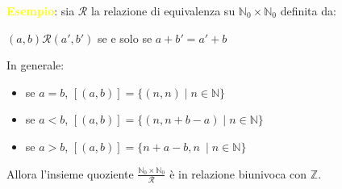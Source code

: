 \textcolor{yellow}{\textbf{Esempio}}: sia $\mathcal{R}$ la relazione di equivalenza su $\mathbb{N}_0 \times \mathbb{N}_0$ definita da:
\begin{center}
    $(a,b)\mathcal{R}(a',b')$ se e solo se $a+b' = a'+b$
\end{center}
In generale:
\begin{itemize}
    \item se $a=b$, $[(a,b)] = \{(n,n) \; | \; n \in \mathbb{N}\}$
    \item se $a<b$, $[(a,b)] = \{(n,n+b-a) \; | \; n \in \mathbb{N}\}$
    \item se $a>b$, $[(a,b)] = \{n+a-b,n\ \; | \; n \in \mathbb{N}\}$
\end{itemize}
Allora l'insieme quoziente $\frac{\mathbb{N}_0 \times \mathbb{N}_0}{\mathcal{R}}$ è in relazione biunivoca con $\mathbb{Z}$. \\ 

